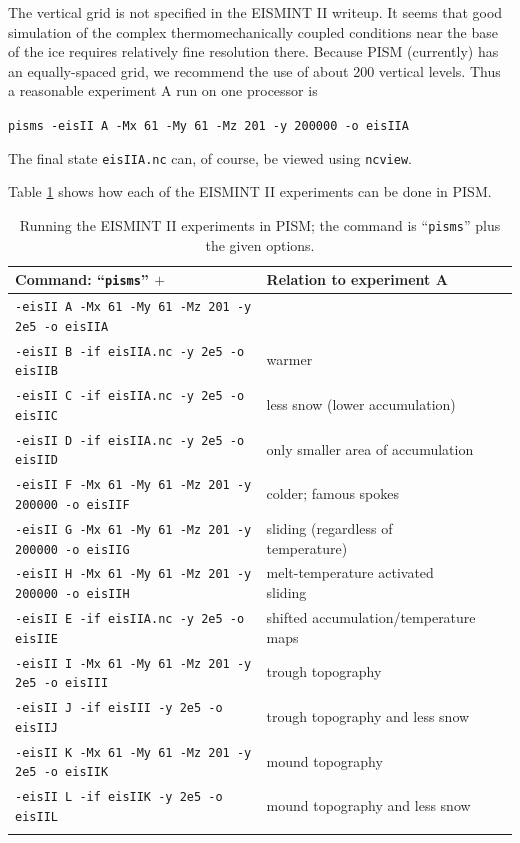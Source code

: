 \documentclass[11pt,final]{amsart}
\renewcommand{\t}[1]{\texttt{#1}}
\begin{document}
The vertical grid is not specified in the EISMINT II writeup.  It seems that good simulation of the complex thermomechanically coupled conditions near the base of the ice requires relatively fine resolution there.  Because PISM (currently) has an equally-spaced grid, we recommend the use of about 200 vertical levels.  Thus a reasonable experiment A run on one processor is

\verb|pisms -eisII A -Mx 61 -My 61 -Mz 201 -y 200000 -o eisIIA|

\noindent The final state \verb|eisIIA.nc| can, of course, be viewed using \verb|ncview|.

Table \ref{tab:eisII} shows how each of the EISMINT II experiments can be done in PISM.

\begin{table}[ht]
\caption{Running the EISMINT II experiments in PISM; the command is ``\t{pisms}'' plus the given options.}\label{tab:eisII}
\small
\begin{tabular}{@{}llll}\hline
\textbf{Command: ``\t{pisms}'' $+$} & \textbf{Relation to experiment A} \\ \hline
\verb|-eisII A -Mx 61 -My 61 -Mz 201 -y 2e5 -o eisIIA| & \\
\verb|-eisII B -if eisIIA.nc -y 2e5 -o eisIIB| & warmer \\
\verb|-eisII C -if eisIIA.nc -y 2e5 -o eisIIC| & less snow (lower accumulation)\\
\verb|-eisII D -if eisIIA.nc -y 2e5 -o eisIID| & only smaller area of accumulation \\
\verb|-eisII F -Mx 61 -My 61 -Mz 201 -y 200000 -o eisIIF| & colder; famous spokes \cite{BBL} \\
\verb|-eisII G -Mx 61 -My 61 -Mz 201 -y 200000 -o eisIIG| & sliding (regardless of temperature) \\
\verb|-eisII H -Mx 61 -My 61 -Mz 201 -y 200000 -o eisIIH| & melt-temperature activated sliding \\ \hline
\verb|-eisII E -if eisIIA.nc -y 2e5 -o eisIIE| & shifted accumulation/temperature maps \\
\verb|-eisII I -Mx 61 -My 61 -Mz 201 -y 2e5 -o eisIII| & trough topography \\
\verb|-eisII J -if eisIII -y 2e5 -o eisIIJ| & trough topography and less snow \\
\verb|-eisII K -Mx 61 -My 61 -Mz 201 -y 2e5 -o eisIIK| & mound topography \\
\verb|-eisII L -if eisIIK -y 2e5 -o eisIIL| & mound topography and less snow \\
\hline\normalsize
\end{tabular}\end{table}
\end{document}
